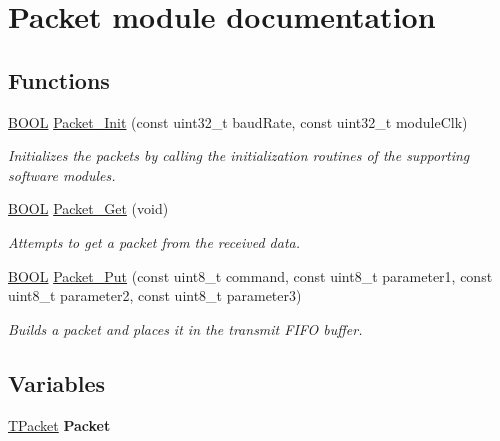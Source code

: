 \hypertarget{group___packet__module}{}\section{Packet module documentation}
\label{group___packet__module}
\subsection*{Functions}
\begin{DoxyCompactItemize}
\item 
\hyperlink{types_8h_a3e5b8192e7d9ffaf3542f1210aec18dd}{B\+O\+O\+L} \hyperlink{group___packet__module_gaba27caca573c81c3160866cfdc03d6c9}{Packet\+\_\+\+Init} (const uint32\+\_\+t baud\+Rate, const uint32\+\_\+t module\+Clk)
\begin{DoxyCompactList}\small\item\em Initializes the packets by calling the initialization routines of the supporting software modules. \end{DoxyCompactList}\item 
\hyperlink{types_8h_a3e5b8192e7d9ffaf3542f1210aec18dd}{B\+O\+O\+L} \hyperlink{group___packet__module_ga0864b60176a8caa5e5b20e8b0e6dcbd3}{Packet\+\_\+\+Get} (void)
\begin{DoxyCompactList}\small\item\em Attempts to get a packet from the received data. \end{DoxyCompactList}\item 
\hyperlink{types_8h_a3e5b8192e7d9ffaf3542f1210aec18dd}{B\+O\+O\+L} \hyperlink{group___packet__module_ga248c4a5c53ef328f89e26ee5cb3b9131}{Packet\+\_\+\+Put} (const uint8\+\_\+t command, const uint8\+\_\+t parameter1, const uint8\+\_\+t parameter2, const uint8\+\_\+t parameter3)
\begin{DoxyCompactList}\small\item\em Builds a packet and places it in the transmit F\+I\+F\+O buffer. \end{DoxyCompactList}\end{DoxyCompactItemize}
\subsection*{Variables}
\begin{DoxyCompactItemize}
\item 
\hypertarget{group___packet__module_gac74c1cf77ae5807a61baefd6df20201e}{}\hyperlink{struct_t_packet}{T\+Packet} {\bfseries Packet}\label{group___packet__module_gac74c1cf77ae5807a61baefd6df20201e}

\end{DoxyCompactItemize}


